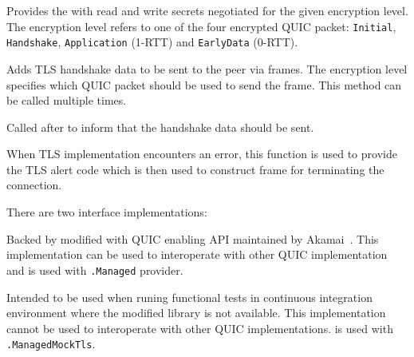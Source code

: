 \begin{description}

   Provides the \ManagedQuicConnection{} with read
and write secrets negotiated for the given encryption level. The encryption level refers to one of
the four encrypted QUIC packet: \texttt{Initial}, \texttt{Handshake}, \texttt{Application} (1-RTT)
and \texttt{EarlyData} (0-RTT).

Adds TLS handshake data to be sent to the peer via \CRYPTO{} frames. The encryption level specifies
which QUIC packet should be used to send the \CRYPTO{} frame. This method can be called multiple
times.

   Called after  to
inform \ManagedQuicConnection{} that the handshake data should be sent.

   When TLS implementation
encounters an error, this function is used to provide the TLS alert code which is then used to
construct \CONNECTIONCLOSE{} frame for terminating the connection.

\end{description}

There are two \ITls{} interface implementations:

\begin{itemize}

  \litem[]{\OpenSslTls{}} Backed by modified \libopenssl{} with QUIC enabling API maintained by
Akamai~\cite{AkamaiOpensslGithub}. This implementation can be used to interoperate with other QUIC implementation and is used with \texttt{\QuicImplementationProviders{}\allowbreak{}.Managed} provider.

  \litem[]{\MockTls{}} Intended to be used when runing functional tests in continuous integration environment where the modified \libopenssl{} library is not available. This implementation cannot be used to interoperate with other QUIC implementations. \MockTls{} is used with \texttt{\QuicImplementationProviders{}\allowbreak{}.ManagedMockTls}.

\end{itemize}

